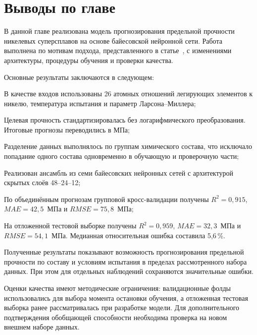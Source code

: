 \section{Выводы по главе}

В данной главе реализована модель прогнозирования
предельной прочности никелевых суперсплавов
на основе байесовской нейронной сети.
Работа выполнена по мотивам подхода,
представленного в статье~\cite{BRANN},
с изменениями архитектуры, процедуры обучения
и проверки качества.

Основные результаты заключаются в следующем:

\begin{itemizePaper}
    \item В качестве входов использованы
    26 атомных отношений легирующих элементов
    к никелю, температура испытания
    и параметр Ларсона--Миллера;

    \item Целевая прочность стандартизировалась
    без логарифмического преобразования.
    Итоговые прогнозы переводились в МПа;

    \item Разделение данных выполнялось
    по группам химического состава,
    что исключало попадание одного состава
    одновременно в обучающую и проверочную части;

    \item Реализован ансамбль из семи
    байесовских нейронных сетей с архитектурой
    скрытых слоёв 48--24--12;

    \item По объединённым прогнозам групповой
    кросс-валидации получены
    $R^2=0{,}915$, $MAE=42{,}5$~МПа
    и $RMSE=75{,}8$~МПа;

    \item На отложенной тестовой выборке
    получены $R^2=0{,}959$,
    $MAE=32{,}3$~МПа и $RMSE=54{,}1$~МПа.
    Медианная относительная ошибка
    составила 5,6\,\%.
\end{itemizePaper}

Полученные результаты показывают возможность
прогнозирования предельной прочности
по составу и условиям испытания
в пределах рассмотренного набора данных.
При этом для отдельных наблюдений
сохраняются значительные ошибки.

Оценки качества имеют методические ограничения:
валидационные фолды использовались для выбора
момента остановки обучения, а отложенная
тестовая выборка ранее рассматривалась
при разработке модели.
Для дополнительного подтверждения обобщающей
способности необходима проверка
на новом внешнем наборе данных.
